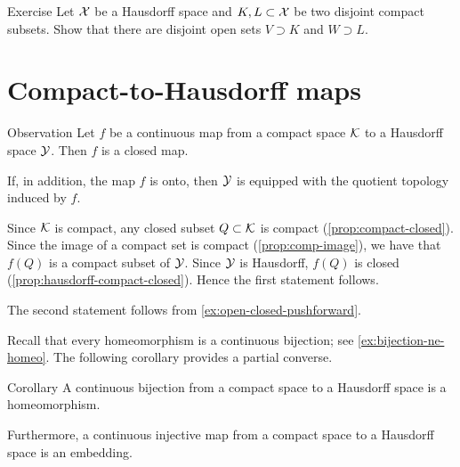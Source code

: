 \begin{thm}{Exercise}\label{ex:normal-hausdorff}
Let $\mathcal{X}$ be a Hausdorff space and $K,L\subset \mathcal{X}$ be two disjoint compact subsets.
Show that there are disjoint open sets $V\supset K$ and $W\supset L$.
\end{thm}

\section{Compact-to-Hausdorff maps}\label{sec:compact-to-hausdorff}

\begin{thm}{Observation}\label{obs:compact-to-hausdorff}
Let $f$ be a continuous map from a compact space $\mathcal{K}$ to a Hausdorff space $\mathcal{Y}$.
Then $f$ is a closed map.

If, in addition, the map $f$ is onto, then $\mathcal{Y}$ is equipped with the quotient topology induced by $f$.
\end{thm}

Since $\mathcal{K}$ is compact, any closed subset $Q\subset \mathcal{K}$ is compact (\ref{prop:compact-closed}).
Since the image of a compact set is compact (\ref{prop:comp-image}), we have that $f(Q)$ is a compact subset of $\mathcal{Y}$.
Since $\mathcal{Y}$ is Hausdorff, $f(Q)$ is closed (\ref{prop:hausdorff-compact-closed}).
Hence the first statement follows.

The second statement follows from \ref{ex:open-closed-pushforward}.
\qeds

Recall that every homeomorphism is a continuous bijection; see \ref{ex:bijection-ne-homeo}.
The following corollary provides a partial converse.

\begin{thm}{Corollary}\label{cor:cont-bijection=homeomorphism}
A continuous bijection from a compact space to a Hausdorff space is a homeomorphism.

Furthermore, a continuous injective map from a compact space to a Hausdorff space is an embedding.
\end{thm}

